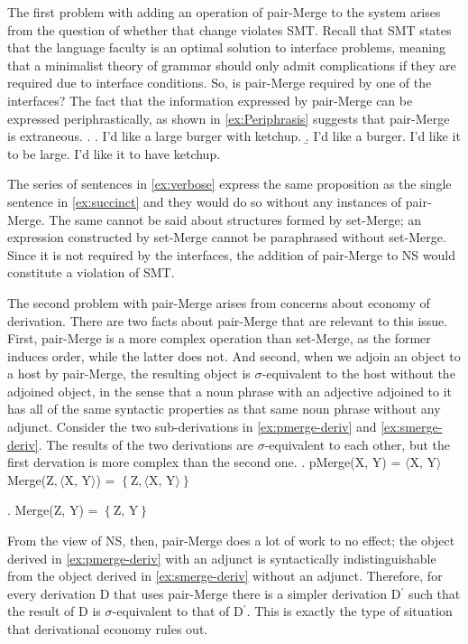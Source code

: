 \documentclass[MilwayThesis]{subfiles}
\begin{document}
The first problem with adding an operation of pair-Merge to the system arises from the question of whether that change violates SMT.
Recall that SMT states that the language faculty is an optimal solution to interface problems, meaning that a minimalist theory of grammar should only admit complications if they are required due to interface conditions.
So, is pair-Merge required by one of the interfaces?
The fact that the information expressed by pair-Merge can be expressed periphrastically, as shown in \cref{ex:Periphrasis} suggests that pair-Merge is extraneous.
\ex.\label{ex:Periphrasis}
\a. I'd like a large burger with ketchup.\label{ex:succinct}
\b. I'd like a burger. I'd like it to be large. I'd like it to have ketchup.\label{ex:verbose}

The series of sentences in \cref{ex:verbose} express the same proposition as the single sentence in \cref{ex:succinct} and they would do so without any instances of pair-Merge.
The same cannot be said about structures formed by set-Merge; an expression constructed by set-Merge cannot be paraphrased without set-Merge.
Since it is not required by the interfaces, the addition of pair-Merge to NS would constitute a violation of SMT.

The second problem with pair-Merge arises from concerns about economy of derivation.
There are two facts about pair-Merge that are relevant to this issue.
First, pair-Merge is a more complex operation than set-Merge, as the former induces order, while the latter does not.
And second, when we adjoin an object to a host by pair-Merge, the resulting object is $\sigma$-equivalent to the host without the adjoined object, in the sense that a noun phrase with an adjective adjoined to it has all of the same syntactic properties as that same noun phrase without any adjunct.
Consider the two sub-derivations in \cref{ex:pmerge-deriv} and \cref{ex:smerge-deriv}.
The results of the two derivations are $\sigma$-equivalent to each other, but the first dervation is more complex than the second one.
\ex.\label{ex:pmerge-deriv} pMerge(X, Y) = $\langle\text{X, Y}\rangle$\\
Merge(Z$, \langle\text{X, Y}\rangle$) = $\left\{ \text{Z}, \langle\text{X, Y}\rangle \right\}$

\ex.\label{ex:smerge-deriv} Merge(Z, Y) = $\left\{ \text{Z, Y} \right\}$

From the view of NS, then, pair-Merge does a lot of work to no effect; the object derived in \cref{ex:pmerge-deriv} with an adjunct is syntactically indistinguishable from the object derived in \cref{ex:smerge-deriv} without an adjunct.
Therefore, for every derivation D that uses pair-Merge there is a simpler derivation D$^\prime$ such that the result of D is $\sigma$-equivalent to that of D$^\prime$.
This is exactly the type of situation that derivational economy rules out.
\end{document}
